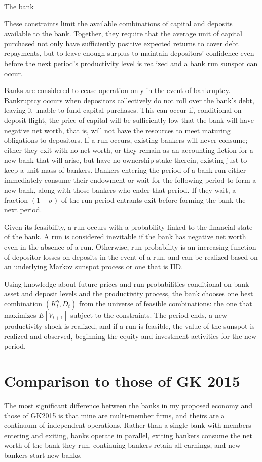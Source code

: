 \documentclass[english]{article}
\begin{document}
The bank 

These constraints limit the available combinations of capital and deposits available to the bank. 
Together, they require that the average unit of capital purchased not only have sufficiently positive 
expected returns to cover debt repayments, but to leave enough surplus to maintain depositors' 
confidence even before the next period's productivity level is realized and a bank run sunspot can 
occur.

Banks are considered to cease operation only in the event of bankruptcy. Bankruptcy occurs when 
depositors collectively do not roll over the bank's debt, leaving it unable to fund capital purchases. 
This can occur if, conditional on deposit flight, the price of capital will be sufficiently low that 
the bank will have negative net worth, that is, will not have the resources to meet maturing obligations 
to depositors. If a run occurs, existing bankers will never consume; either they exit with no net worth, 
or they remain as an accounting fiction for a new bank that will arise, but have no ownership stake 
therein, existing just to keep a unit mass of bankers. Bankers entering the period of a bank run 
either immediately consume their endowment or wait for the following period to form a new bank, 
along with those bankers who ender that period. If they wait, a fraction $(1-\sigma)$ of the run-period 
entrants exit before forming the bank the next period. 

Given its feasibility, a run occurs with a probability linked to the financial state of the bank. A 
run is considered inevitable if the bank has negative net worth even in the absence of a run. Otherwise, 
run probability is an increasing function of depositor losses on deposits in the event of a run, and 
can be realized based on an underlying Markov sunspot process or one that is IID.

Using knowledge about future prices and run probabilities conditional on bank asset and deposit levels 
and the productivity process, the bank chooses one best combination $(K^b_t,  D_t)$ from the universe 
of feasible combinations: the one that maximizes $E[V_{t+1}]$ subject to the constraints. The period 
ends, a new productivity shock is realized, and if a run is feasible, the value of the sunspot is 
realized and observed, beginning the equity and investment activities for the new period.



\section{Comparison to those of GK 2015}
The most significant difference between the banks in my proposed economy and those of GK2015 is that 
mine are multi-member firms, and theirs are a continuum of independent operations. Rather than a single 
bank with members entering and exiting, banks operate in parallel, exiting bankers consume the net worth 
of the bank they run, continuing bankers retain all earnings, and new bankers start new banks. 
\end{document}
